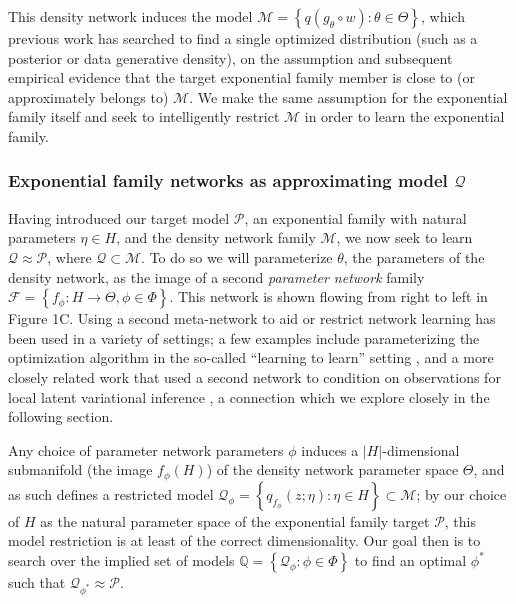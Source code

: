 \documentclass[twoside]{article}
\begin{document}
This density network induces the model $\mathcal{M} = \left\{ q(g_\theta \circ w) : \theta \in \Theta \right\}$, which previous work has searched to find a single optimized distribution (such as a posterior or data generative density), on the assumption and subsequent empirical evidence that the target exponential family member is close to (or approximately belongs to) $\mathcal{M}$.   We make the same assumption for the exponential family itself and seek to intelligently restrict $\mathcal{M}$ in order to learn the exponential family.  

\subsubsection{Exponential family networks as approximating model $\mathcal{Q}$}

Having introduced our target model $\mathcal{P}$, an exponential family with natural parameters $\eta \in H$, and the density network family $\mathcal{M}$, we now seek to learn $\mathcal{Q} \approx \mathcal{P}$, where $\mathcal{Q} \subset \mathcal{M}$.  
To do so we will parameterize $\theta$, the parameters of the density network, as the image of a second \emph{parameter network} family $\mathcal{F} = \left\{ f_\phi : H \rightarrow \Theta, \phi \in \Phi\right\}$.   
This network is shown flowing from right to left in Figure 1C.  
Using a second meta-network to aid or restrict network learning has been used in a variety of settings; a few examples include parameterizing the optimization algorithm in the so-called ``learning to learn'' setting \citep{andrychowicz2016learning}, and a more closely related work that used a second network to condition on observations for local latent variational inference \citep{rezende2015variational}, a connection which we explore closely in the following section.

Any choice of parameter network parameters $\phi$ induces a $|H|$-dimensional submanifold (the image $f_\phi(H)$) of the density network parameter space $\Theta$, and as such defines a restricted model $\mathcal{Q}_\phi = \left\{ q_{f_{\phi}}(z; \eta): \eta \in H\right\} \subset \mathcal{M}$; by our choice of $H$ as the natural parameter space of the exponential family target $\mathcal{P}$, this model restriction is at least of the correct dimensionality.
Our goal then is to search over the implied set of models $\mathbb{Q} = \left\{ \mathcal{Q}_\phi : \phi \in \Phi \right\}$ to find an optimal $\phi^*$ such that $\mathcal{Q}_{\phi^*} \approx \mathcal{P}$. 
\end{document}
